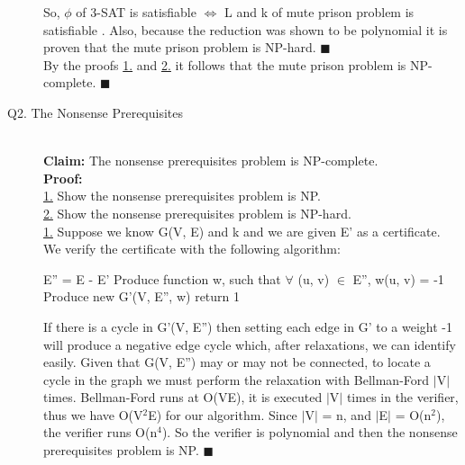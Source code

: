 \documentclass[10pt]{csc_assignment}
\begin{document}
\begin{description}
So, $\phi$ of 3-SAT is satisfiable $\Leftrightarrow$ L and k of mute prison problem is satisfiable . Also, because the reduction was shown to be polynomial it is proven that the mute prison problem is NP-hard. $\blacksquare$\\

By the proofs \underline{1.} and \underline{2.} it follows that the mute prison problem is NP-complete. $\blacksquare$\\


\newpage
\item[Q2. The Nonsense Prerequisites]

~\\
\textbf{Claim:} The nonsense prerequisites problem is NP-complete.\\
\textbf{Proof:}\\
\underline{1.} Show the nonsense prerequisites problem is NP.\\
\underline{2.} Show the nonsense prerequisites problem is NP-hard.\\

\underline{1.} Suppose we know G(V, E) and k and we are given E' as a certificate. We verify the certificate with the following algorithm:\\
\begin{algorithm}[H]
 \LinesNumbered 
E'' = E - E'\;
Produce function w, such that $\forall$ (u, v) $\in$ E'', w(u, v) = -1\;
Produce new G'(V, E'', w)\;
return 1\;
\end{algorithm}
If there is a cycle in G'(V, E'') then setting each edge in G' to a weight -1 will produce a negative edge cycle which, after relaxations, we can identify easily. Given that G(V, E'') may or may not be connected, to locate a cycle in the graph we must perform the relaxation with Bellman-Ford $\mid$V$\mid$ times. Bellman-Ford runs at O(VE), it is executed $\mid$V$\mid$ times in the verifier, thus we have O(V$^2$E) for our algorithm. Since $\mid$V$\mid$ = n, and $\mid$E$\mid$ = O(n$^2$), the verifier runs O(n$^4$). So the verifier is polynomial and then the nonsense prerequisites problem is NP. $\blacksquare$\\ 


\end{description}
\end{document}
